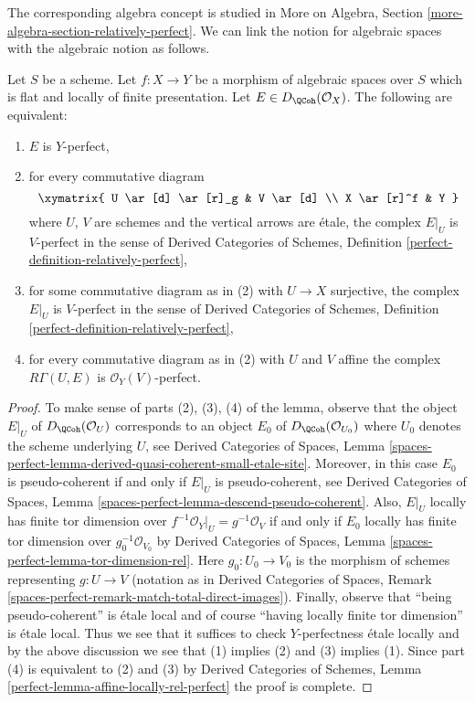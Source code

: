 \noindent
The corresponding algebra concept is studied in
More on Algebra, Section \ref{more-algebra-section-relatively-perfect}.
We can link the notion for algebraic spaces with the
algebraic notion as follows.

\begin{lemma}
\label{lemma-affine-locally-rel-perfect}
Let $S$ be a scheme. Let $f : X \to Y$ be a morphism of algebraic spaces
over $S$ which is flat and locally of finite presentation.
Let $E \in D_\QCoh(\mathcal{O}_X)$. The following are equivalent:
\begin{enumerate}
\item $E$ is $Y$-perfect,
\item for every commutative diagram
$$
\xymatrix{
U \ar[d] \ar[r]_g & V \ar[d] \\
X \ar[r]^f & Y
}
$$
where $U$, $V$ are schemes and the vertical arrows are \'etale, the complex
$E|_U$ is $V$-perfect in the sense of Derived Categories of Schemes,
Definition \ref{perfect-definition-relatively-perfect},
\item for some commutative diagram as in (2) with $U \to X$
surjective, the complex $E|_U$ is $V$-perfect in the sense of
Derived Categories of Schemes,
Definition \ref{perfect-definition-relatively-perfect},
\item for every commutative diagram as in (2) with $U$ and $V$
affine the complex $R\Gamma(U, E)$ is $\mathcal{O}_Y(V)$-perfect.
\end{enumerate}
\end{lemma}

\begin{proof}
To make sense of parts (2), (3), (4) of the lemma, observe that
the object $E|_U$ of $D_\QCoh(\mathcal{O}_U)$ corresponds to
an object $E_0$ of $D_\QCoh(\mathcal{O}_{U_0})$ where $U_0$
denotes the scheme underlying $U$, see Derived Categories of Spaces,
Lemma \ref{spaces-perfect-lemma-derived-quasi-coherent-small-etale-site}.
Moreover, in this case $E_0$ is pseudo-coherent if and only if
$E|_U$ is pseudo-coherent, see Derived Categories of Spaces,
Lemma \ref{spaces-perfect-lemma-descend-pseudo-coherent}.
Also, $E|_U$ locally has finite tor dimension over
$f^{-1}\mathcal{O}_Y|_U = g^{-1}\mathcal{O}_V$ if and only if
$E_0$ locally has finite tor dimension over $g_0^{-1}\mathcal{O}_{V_0}$
by Derived Categories of Spaces, Lemma
\ref{spaces-perfect-lemma-tor-dimension-rel}.
Here $g_0 : U_0 \to V_0$ is the morphism of schemes representing
$g : U \to V$ (notation as in Derived Categories of Spaces,
Remark \ref{spaces-perfect-remark-match-total-direct-images}).
Finally, observe that ``being pseudo-coherent'' is \'etale local and
of course ``having locally finite tor dimension'' is \'etale local.
Thus we see that it suffices to check $Y$-perfectness \'etale locally
and by the above discussion we see that (1) implies (2) and
(3) implies (1). Since part (4) is equivalent
to (2) and (3) by
Derived Categories of Schemes, Lemma
\ref{perfect-lemma-affine-locally-rel-perfect}
the proof is complete.
\end{proof}


